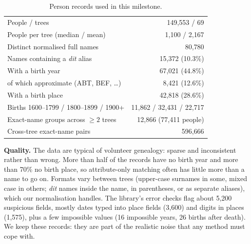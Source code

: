 \begin{table}[h]
\centering
\caption{Person records used in this milestone.}
\label{tab:data}
\begin{tabular}{lr}
\hline
People / trees & 149{,}553 / 69 \\
People per tree (median / mean) & 1{,}100 / 2{,}167 \\
Distinct normalised full names & 80{,}780 \\
Names containing a \textit{dit} alias & 15{,}372 (10.3\%) \\
With a birth year & 67{,}021 (44.8\%) \\
\quad of which approximate (ABT, BEF, \dots) & 8{,}421 (12.6\%) \\
With a birth place & 42{,}818 (28.6\%) \\
Births 1600--1799 / 1800--1899 / 1900+ & 11{,}862 / 32{,}431 / 22{,}717 \\
Exact-name groups across $\geq 2$ trees & 12{,}866 (77{,}411 people) \\
Cross-tree exact-name pairs & 596{,}666 \\
\hline
\end{tabular}
\end{table}

\textbf{Quality.}
The data are typical of volunteer genealogy: sparse and inconsistent rather than wrong. More than half of the records have no birth year and more than 70\% no birth place, so attribute-only matching often has little more than a name to go on.
Formats vary between trees (upper-case surnames in some, mixed case in others; \textit{dit} names inside the name, in parentheses, or as separate aliases), which our normalisation handles.
The library's error checks flag about 5{,}200 suspicious fields, mostly dates typed into place fields (3{,}600) and digits in places (1{,}575), plus a few impossible values (16 impossible years, 26 births after death).
We keep these records: they are part of the realistic noise that any method must cope with.
